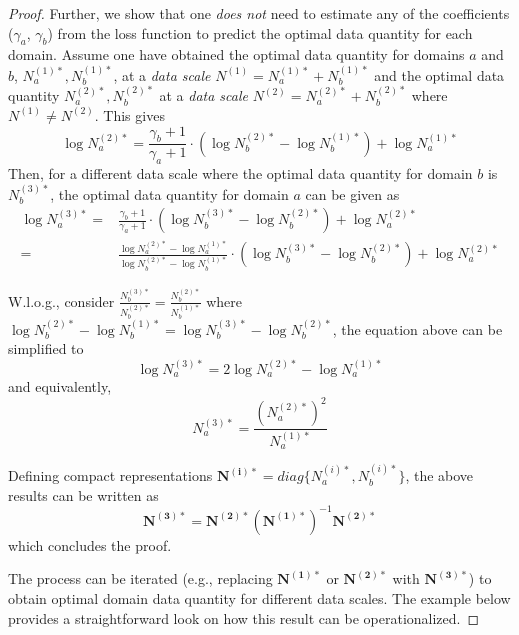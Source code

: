 \documentclass{article} %
\begin{document}
\begin{appendices}{}
\begin{proof}
Further, we show that one \textit{does not} need to estimate any of the coefficients ($\gamma_a$, $\gamma_b$) from the loss function to predict the optimal data quantity for each domain. 
Assume one have obtained the optimal data quantity for domains $a$ and $b$, $N_a^{(1)*},N_b^{(1)*}$, at a \textit{data scale} $N^{(1)}=N_a^{(1)*}+N_b^{(1)*}$ and the optimal data quantity $N_a^{(2)*},N_b^{(2)*}$  at a \textit{data scale} $N^{(2)}=N_a^{(2)*}+N_b^{(2)*}$ where $ N^{(1)} \neq N^{(2)}$. This gives
\begin{equation*}
    \log N_a^{(2)*} = \frac{\gamma_b+1}{\gamma_a+1} \cdot (\log N_b^{(2)*}-\log N_b^{(1)*})  + \log  N_a^{(1)*}
\end{equation*}
Then, for a different data scale where the optimal data quantity for domain $b$ is $N_b^{(3)*}$, the optimal data quantity for domain $a$ can be given as
\begin{equation*}
\begin{aligned}
    \log N_a^{(3)*} =& \frac{\gamma_b+1}{\gamma_a+1} \cdot (\log N_b^{(3)*}-\log N_b^{(2)*})  + \log  N_a^{(2)*}\\
    =&\frac{\log  N_a^{(2)*}-\log  N_a^{(1)*}}{\log N_b^{(2)*}-\log N_b^{(1)*}}\cdot (\log N_b^{(3)*}-\log N_b^{(2)*})  + \log  N_a^{(2)*}
\end{aligned}
\end{equation*}

W.l.o.g., consider $\frac{N_b^{(3)*}}{N_b^{(2)*}}=\frac{N_b^{(2)*}}{N_b^{(1)*}}$
where $\log N_b^{(2)*}-\log N_b^{(1)*}=\log N_b^{(3)*}-\log N_b^{(2)*}$, the equation above can be simplified to
\begin{equation*}
    \log N_a^{(3)*} = 2\log N_a^{(2)*} - \log N_a^{(1)*}
\end{equation*}
and equivalently,
\begin{equation*}
    N_a^{(3)*} = \frac{(N_a^{(2)*})^2}{N_a^{(1)*}}
\end{equation*}

Defining compact representations $\mathbf{N^{(i)*}}=diag\{N_a^{(i)*},N_b^{(i)*}\}$, the above results can be written as
\begin{equation*}
    \mathbf{N^{(3)*}}=\mathbf{N^{(2)*}}(\mathbf{N^{(1)*}})^{-1}\mathbf{N^{(2)*}}
\end{equation*}
which concludes the proof.


The process can be iterated (e.g., replacing $\mathbf{N^{(1)*}}$ or $\mathbf{N^{(2)*}}$ with $\mathbf{N^{(3)*}}$) to obtain optimal domain data quantity for different data scales.
 The example below provides a straightforward look on how this result can be operationalized.
\end{proof}


\end{appendices}
\end{document}
